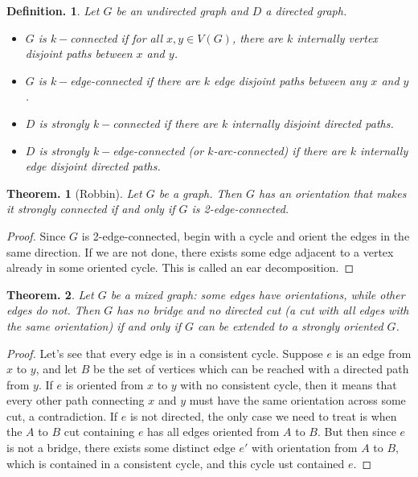 \documentclass[11pt, a4paper]{memoir}
\theoremstyle{change}
\newtheorem{theorem}{Theorem.}[section]
\theoremstyle{plain}
\theoremstyle{nonumberplain}
\newtheorem{definition}{Definition.}
\newtheorem{proof}{Proof}
\numberwithin{equation}{section}
\begin{document}
\begin{definition}
    Let $G$ be an undirected graph and $D$ a directed graph.
    \begin{itemize}[nl]
        \item $G$ is $k-$connected if for all $x,y\in V(G)$, there are $k$ internally vertex disjoint paths between $x$ and $y$.
        \item $G$ is $k-$edge-connected if there are $k$ edge disjoint paths between any $x$ and $y$.
        \item $D$ is strongly $k-$connected if there are $k$ internally disjoint directed paths.
        \item $D$ is strongly $k-$edge-connected (or $k$-arc-connected) if there are $k$ internally edge disjoint directed paths.
    \end{itemize}
\end{definition}
\begin{theorem}[Robbin]
    Let $G$ be a graph.
    Then $G$ has an orientation that makes it strongly connected if and only if $G$ is 2-edge-connected.
\end{theorem}
\begin{proof}
    Since $G$ is 2-edge-connected, begin with a cycle and orient the edges in the same direction.
    If we are not done, there exists some edge adjacent to a vertex already in some oriented cycle.
    This is called an ear decomposition.
\end{proof}
\begin{theorem}
    Let $G$ be a mixed graph: some edges have orientations, while other edges do not.
    Then $G$ has no bridge and no directed cut (a cut with all edges with the same orientation) if and only if $G$ can be extended to a strongly oriented $G$.
\end{theorem}
\begin{proof}
    Let's see that every edge is in a consistent cycle.
    Suppose $e$ is an edge from $x$ to $y$, and let $B$ be the set of vertices which can be reached with a directed path from $y$.
    If $e$ is oriented from $x$ to $y$ with no consistent cycle, then it means that every other path connecting $x$ and $y$ must have the same orientation across some cut, a contradiction.
    If $e$ is not directed, the only case we need to treat is when the $A$ to $B$ cut containing $e$ has all edges oriented from $A$ to $B$.
    But then since $e$ is not a bridge, there exists some distinct edge $e'$ with orientation from $A$ to $B$, which is contained in a consistent cycle, and this cycle ust contained $e$.
\end{proof}
\end{document}
